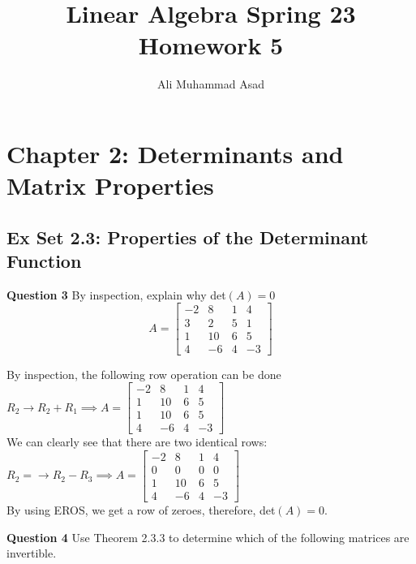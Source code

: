 \documentclass[addpoints]{exam}
\title{Linear Algebra Spring 23\\ Homework 5}
\author{Ali Muhammad Asad}
\begin{document}
\maketitle
\begin{sloppypar}
\section*{\textbf{Chapter 2: Determinants and Matrix Properties}}
\subsection*{\textbf{Ex Set 2.3: Properties of the Determinant Function}}
\begin{questions}
    \question
    \textbf{Question 3} By inspection, explain why det$(A) = 0$
    $$ A = \begin{bmatrix}
        -2 & 8 & 1 & 4 \\ 3 & 2 & 5 & 1 \\ 1 & 10 & 6 & 5 \\ 4 & -6 & 4 & -3
    \end{bmatrix} $$
    \begin{solution}
        By inspection, the following row operation can be done \\ 
        $ R_2 \rightarrow R_2 + R_1 \implies A = \begin{bmatrix}
            -2 & 8 & 1 & 4 \\ 1 & 10 & 6 & 5 \\ 1 & 10 & 6 & 5 \\ 4 & -6 & 4 & -3
        \end{bmatrix} $
        \\ We can clearly see that there are two identical rows: \\ 
        $ R_2 = \rightarrow R_2 - R_3 \implies A = \begin{bmatrix}
            -2 & 8 & 1 & 4 \\ 0 & 0 & 0 & 0 \\ 1 & 10 & 6 & 5 \\ 4 & -6 & 4 & -3
        \end{bmatrix} $
        \\ By using EROS, we get a row of zeroes, therefore, det$(A) = 0$.
    \end{solution}
    \pagebreak
    \question
    \textbf{Question 4} Use Theorem 2.3.3 to determine which of the following matrices are invertible. 
        

\end{questions}
\end{sloppypar}
\end{document}
